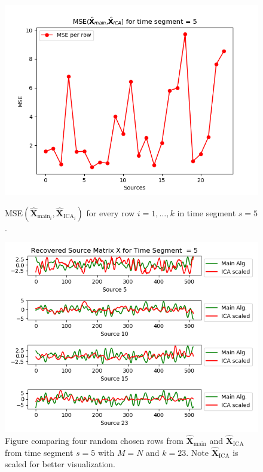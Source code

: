 \begin{figure}[H]
\begin{widepage}
    \begin{minipage}[t]{.45\textwidth}
\centering
\includegraphics[width=1\linewidth]{figures/ch_7/resultat/mse_none_removed_ica_timeseg5.png}
\caption{MSE$\left(\hat{\mathbf{X}}_{\text{main}_{i}},\hat{\mathbf{X}}_{\text{ICA}_{i}}\right)$ for every row $i = 1, \dots, k$ in time segment $s=5$.}
\label{fig:M=N_2}
\end{minipage} 
\hspace{0.5cm}
\begin{minipage}[t]{.45\textwidth}
\centering
\includegraphics[width=1\linewidth]{figures/ch_7/resultat/EEG_none_removed_scaled_timeseg5S1_CClean.png}
\caption{Figure comparing four random chosen rows from $\hat{\mathbf{X}}_{\text{main}}$ and $\hat{\mathbf{X}}_{\text{ICA}}$ from time segment $s = 5$ with $M = N$ and $k=23$. Note $\hat{\mathbf{X}}_{\text{ICA}}$ is scaled for better visualization.}
	\label{fig:M=N_3}
    \end{minipage}
\end{widepage}
\end{figure}
